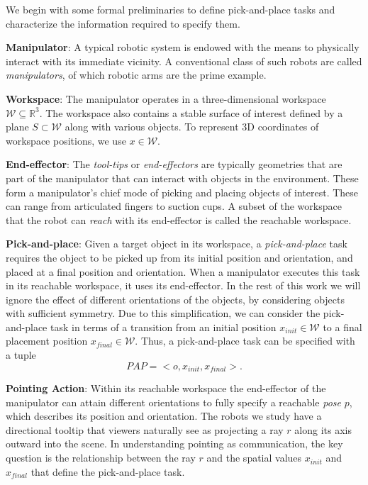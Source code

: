 We begin with some formal preliminaries to define pick-and-place tasks and characterize the information required to specify them.
 
\noindent\textbf{Manipulator}: A typical robotic system is endowed with the means to physically interact with its immediate vicinity. A conventional class of such robots are called \textit{manipulators}, of which robotic arms are the prime example. 

\noindent\textbf{Workspace}: The manipulator operates in a three-dimensional workspace 
$\mathcal{W}\subseteq \mathbb{R}^3$. The workspace also contains a stable surface of interest defined by a plane $S\subset\mathcal{W}$ along with various objects. To represent 3D coordinates of workspace positions, we use $x\in\mathcal{W}$. 

\noindent\textbf{End-effector}: The \textit{tool-tips} or \textit{end-effectors} are typically geometries that are part of the manipulator that can interact with objects in the environment. These form a manipulator's chief mode of picking and placing objects of interest. These can range from articulated fingers to suction cups. A subset of the workspace that the robot can \textit{reach} with its end-effector is called the reachable workspace. 

\noindent\textbf{Pick-and-place}: Given a target object in its workspace, a \textit{pick-and-place} task requires the object to be picked up from its initial position and orientation, and placed at a final position and orientation. When a manipulator executes this task in its reachable workspace, it uses its end-effector. 
In the rest of this work we will ignore the effect of different orientations of the objects, by considering objects with sufficient symmetry. Due to this simplification, we can consider the pick-and-place task in terms of a transition from an initial position $x_{init}\in\mathcal{W}$ to a final placement position $x_{final}\in\mathcal{W}$.  Thus, a pick-and-place task can be specified with a tuple
$$ PAP = < o, x_{init}, x_{final} >. $$

\noindent\textbf{Pointing Action}: Within its reachable workspace the end-effector of the manipulator can attain different orientations to fully specify a reachable \textit{pose} $p$, which describes its position and orientation.  The robots we study have a directional tooltip that viewers naturally see as projecting a ray $r$ along its axis outward into the scene.  In understanding pointing as communication, the key question is the relationship between the ray $r$ and the spatial values $x_{init}$ and $x_{final}$ that define the pick-and-place task.

